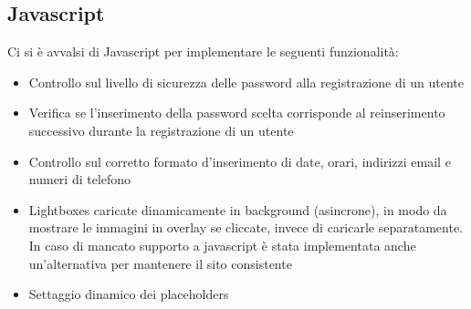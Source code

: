 \pagebreak

\subsection{Javascript}
Ci si è avvalsi di Javascript per implementare le seguenti funzionalità:
\begin{itemize}
\item Controllo sul livello di sicurezza delle password alla registrazione di un utente
\item Verifica se l'inserimento della password scelta corrisponde al reinserimento successivo durante la registrazione di un utente
\item Controllo sul corretto formato d'inserimento di date, orari, indirizzi email e numeri di telefono
\item Lightboxes caricate dinamicamente in background (asincrone), in modo da mostrare le immagini in overlay se cliccate, invece di caricarle separatamente. In caso di mancato supporto a javascript è stata implementata anche un'alternativa per mantenere il sito consistente
\item Settaggio dinamico dei placeholders
\end{itemize}